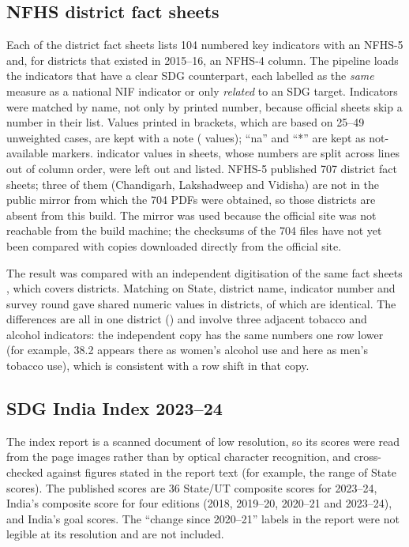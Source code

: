 \documentclass[11pt,a4paper]{article}
\begin{document}
\subsection{NFHS district fact sheets}\label{sec:nfhs}
Each of the \nfhsSheets{} district fact sheets lists 104 numbered key indicators with an NFHS-5 and, for districts that existed in 2015--16, an NFHS-4 column. The pipeline loads the \nNfhsSeries{} indicators that have a clear SDG counterpart, each labelled as the \emph{same} measure as a national NIF indicator or only \emph{related} to an SDG target. Indicators were matched by name, not only by printed number, because \nfhsRenumbered{} official sheets skip a number in their list. Values printed in brackets, which are based on 25--49 unweighted cases, are kept with a note (\nBracket{} values); ``na'' and ``*'' are kept as not-available markers. \nfhsSkippedCells{} indicator values in \nfhsSkippedSheets{} sheets, whose numbers are split across lines out of column order, were left out and listed. NFHS-5 published 707 district fact sheets; three of them (Chandigarh, Lakshadweep and Vidisha) are not in the public mirror from which the 704 PDFs were obtained, so those districts are absent from this build. The mirror was used because the official site was not reachable from the build machine; the checksums of the 704 files have not yet been compared with copies downloaded directly from the official site.

The result was compared with an independent digitisation of the same fact sheets \citep{pratap_nfhs5}, which covers \pvTheirDistricts{} districts. Matching on State, district name, indicator number and survey round gave \pvShared{} shared numeric values in \pvDistricts{} districts, of which \pvSame{} are identical. The \pvDiff{} differences are all in one district (\pvDiffDistricts) and involve three adjacent tobacco and alcohol indicators: the independent copy has the same numbers one row lower (for example, 38.2 appears there as women's alcohol use and here as men's tobacco use), which is consistent with a row shift in that copy.

\subsection{SDG India Index 2023--24}
The index report is a scanned document of low resolution, so its scores were read from the page images rather than by optical character recognition, and cross-checked against figures stated in the report text (for example, the range of State scores). The \nitiRows{} published scores are 36 State/UT composite scores for 2023--24, India's composite score for four editions (2018, 2019--20, 2020--21 and 2023--24), and India's goal scores. The ``change since 2020--21'' labels in the report were not legible at its resolution and are not included.
\end{document}
